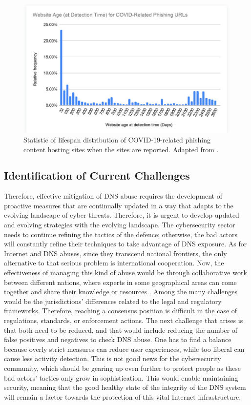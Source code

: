 \captionsetup{font= footnotesize}
\begin{figure}[H]
    \centering
    \includegraphics[width=0.5\linewidth]{background/AgeCovid.png}
    \caption{Statistic of lifespan distribution of COVID-19-related phishing content hosting sites when the sites are reported. Adapted from \cite{Unit42AtricleCovidPhishing2021}.}
    \label{fig:figSixteen}
\end{figure}

\subsection{Identification of Current Challenges}


Therefore, effective mitigation of DNS abuse requires the development of proactive measures that are continually updated in a way that adapts to the evolving landscape of cyber threats. Therefore, it is urgent to develop updated and evolving strategies with the evolving landscape. The cybersecurity sector needs to continue refining the tactics of the defence; otherwise, the bad actors will constantly refine their techniques to take advantage of DNS exposure. As for Internet and DNS abuses, since they transcend national frontiers, the only alternative to that serious problem is international cooperation. Now, the effectiveness of managing this kind of abuse would be through collaborative work between different nations, where experts in some geographical areas can come together and share their knowledge or resources \cite{altulaihan2022cybersecurity}. Among the many challenges would be the jurisdictions' differences related to the legal and regulatory frameworks. Therefore, reaching a consensus position is difficult in the case of regulations, standards, or enforcement actions. The next challenge that arises is that both need to be reduced, and that would include reducing the number of false positives and negatives to check DNS abuse. One has to find a balance because overly strict measures can reduce user experiences, while too liberal can cause less activity detection. This is not good news for the cybersecurity community, which should be gearing up even further to protect people as these bad actors' tactics only grow in sophistication. This would enable maintaining security, meaning that the good healthy state of the integrity of the DNS system will remain a factor towards the protection of this vital Internet infrastructure.


